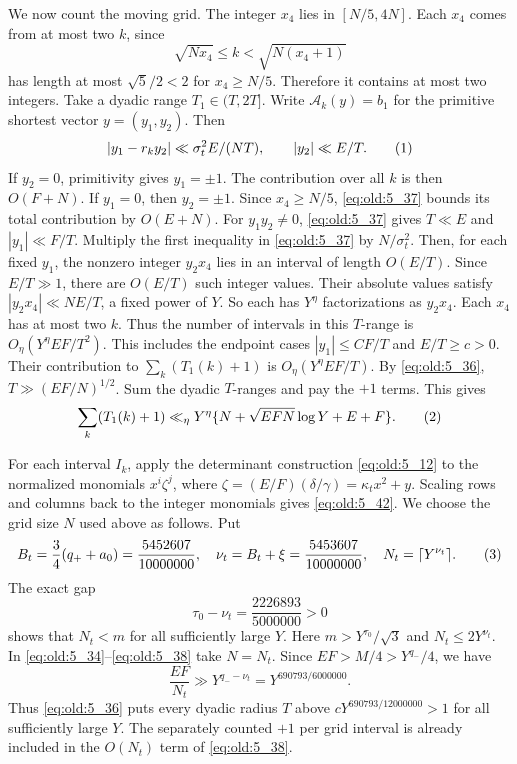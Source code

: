 \begin{samepage}
We now count the moving grid. The integer \(x_4\) lies in
\([N/5,4N]\). Each \(x_4\) comes from at most two \(k\), since
\[
 \sqrt{Nx_4}\le k<\sqrt{N(x_4+1)}
\]
has length at most \(\sqrt5/2<2\) for \(x_4\ge N/5\). Therefore it
contains at most two integers. Take a dyadic range \(T_1\in(T,2T]\). Write
\(\mathcal A_k(y)=b_1\) for the primitive shortest vector
\(y=(y_1,y_2)\). Then
\[
 |y_1-r_ky_2|\ll \sigma_t^2E/(NT),\qquad
 |y_2|\ll E/T.
\AutoTag{eq:old:5_37}
\]
If \(y_2=0\), primitivity gives \(y_1=\pm1\). The contribution
over all \(k\) is then \(O(F+N)\). If \(y_1=0\), then \(y_2=\pm1\).
Since \(x_4\ge N/5\), \eqref{eq:old:5_37} bounds its total contribution by
\(O(E+N)\). For \(y_1y_2\ne0\), \eqref{eq:old:5_37} gives
\(T\ll E\) and \(|y_1|\ll F/T\). Multiply the first inequality in
\eqref{eq:old:5_37} by \(N/\sigma_t^2\). Then, for each fixed \(y_1\), the nonzero
integer \(y_2x_4\) lies in an interval of length \(O(E/T)\). Since
\(E/T\gg1\), there
are \(O(E/T)\) such integer values. Their absolute values satisfy
\(|y_2x_4|\ll NE/T\), a fixed power of \(Y\). So each has \(Y^\eta\) factorizations
as \(y_2x_4\). Each \(x_4\) has at most two \(k\). Thus the number of
intervals in this \(T\)-range is
\(O_\eta(Y^\eta EF/T^2)\). This includes the endpoint cases
\(|y_1|\le C F/T\) and \(E/T\ge c>0\). Their contribution to
\(\sum_k(T_1(k)+1)\) is \(O_\eta(Y^\eta EF/T)\). By \eqref{eq:old:5_36},
\(T\gg(EF/N)^{1/2}\). Sum the dyadic \(T\)-ranges and pay the
\(+1\) terms. This gives
\[
 \sum_k(T_1(k)+1)\ll_\eta
 Y^\eta\{N+\sqrt{EFN}\log Y+E+F\}.
\AutoTag{eq:old:5_38}
\]
\end{samepage}

For each interval \(I_k\), apply the determinant construction \eqref{eq:old:5_12}
to the normalized monomials \(x^i\zeta^j\), where
\(\zeta=(E/F)(\delta/\gamma)=\kappa_t x^2+y\). Scaling rows and columns
back to the integer monomials gives \eqref{eq:old:5_42}. We choose the grid
size \(N\) used above as follows. Put
\[
B_t=\frac34(q_++a_0)
 =\frac{5452607}{10000000},\quad
 \nu_t=B_t+\xi=\frac{5453607}{10000000},\quad
 N_t=\lceil Y^{\nu_t}\rceil .
\AutoTag{eq:old:5_39}
\]
The exact gap
\[
 \tau_0-\nu_t=\frac{2226893}{5000000}>0
\]
shows that \(N_t<m\) for all sufficiently large \(Y\). Here
\(m>Y^{\tau_0}/\sqrt3\) and \(N_t\le2Y^{\nu_t}\). In
\eqref{eq:old:5_34}--\eqref{eq:old:5_38} take \(N=N_t\).
Since \(EF>M/4>Y^{q_-}/4\), we have
\[
\frac{EF}{N_t}\gg Y^{q_- -\nu_t}
=Y^{690793/6000000}.
\]
Thus \eqref{eq:old:5_36} puts every dyadic radius \(T\) above
\(cY^{690793/12000000}>1\) for all sufficiently large \(Y\).
The separately counted \(+1\) per grid interval is already included in
the \(O(N_t)\) term of \eqref{eq:old:5_38}.

